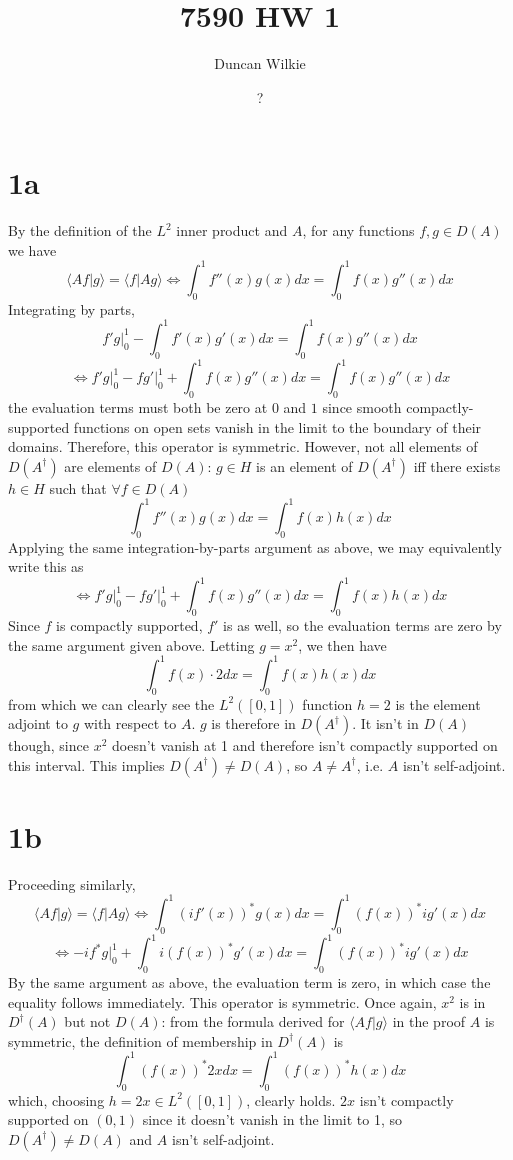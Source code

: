 \documentclass{article}
\title{7590 HW 1}
\author{Duncan Wilkie}
\date{?}
\begin{document}
\maketitle

\section*{1a}
By the definition of the $L^2$ inner product and $A$, for any functions $f,g\in D(A)$ we have
\[\langle Af|g \rangle=\langle f|Ag \rangle\Leftrightarrow \int_0^1f''(x)g(x)dx=\int_0^1f(x)g''(x)dx \]
Integrating by parts,
\[f'g\bigg|_0^1-\int_0^1f'(x)g'(x)dx=\int_0^1f(x)g''(x)dx\]
\[\Leftrightarrow f'g\bigg|_0^1-fg'\bigg|_0^1+\int_0^1f(x)g''(x)dx=\int_0^1f(x)g''(x)dx\]
the evaluation terms  must both be zero at $0$ and $1$ since smooth compactly-supported functions on open sets vanish
in the limit to the boundary of their domains. %
Therefore, this operator is symmetric.
However, not all elements of $D(A^{\dagger})$ are elements of $D(A)$: $g\in H$ is an element of $D(A^{\dagger})$ iff there exists
$h\in H$ such that $\forall f\in D(A)$
\[
  \int_{0}^{1}f''(x)g(x)dx=\int_{0}^{1}f(x)h(x)dx
\]
Applying the same integration-by-parts argument as above, we may equivalently write this as
\[\Leftrightarrow f'g\bigg|_0^1-fg'\bigg|_0^1+\int_0^1f(x)g''(x)dx=\int_0^1f(x)h(x)dx\]
Since $f$ is compactly supported, $f'$ is as well, so the evaluation terms are zero by the same argument given above.
Letting $g=x^{2}$, we then have
\[\int_{0}^{1}f(x)\cdot 2dx=\int_{0}^{1}f(x)h(x)dx\]
from which we can clearly see the $L^{2}([0,1])$ function $h=2$ is the element adjoint to $g$ with respect to $A$.
$g$ is therefore in $D(A^{\dagger})$.
It isn't in $D(A)$ though, since $x^{2}$ doesn't vanish at 1 and therefore isn't compactly supported on this interval.
This implies $D(A^{\dagger})\neq D(A)$, so $A\neq A^{\dagger}$, i.e. $A$ isn't self-adjoint.

\section*{1b}
Proceeding similarly,
\[
  \langle Af|g \rangle=\langle f|Ag \rangle
  \Leftrightarrow \int_{0}^{1}(if'(x))^{*}g(x)dx=\int_{0}^{1}(f(x))^{*}ig'(x)dx
\]
\[
  \Leftrightarrow -if^{*}g\bigg|_{0}^{1}+\int_{0}^{1}i(f(x))^{*}g'(x)dx=\int_{0}^{1}(f(x))^{*}ig'(x)dx
\]
By the same argument as above, the evaluation term is zero, in which case the equality follows immediately.
This operator is symmetric.
Once again, $x^{2}$ is in $D^{\dagger}(A)$ but not $D(A)$: from the formula derived for $\langle Af|g \rangle$ in the proof $A$ is symmetric,
the definition of membership in $D^{\dagger}(A)$ is
\[\int_{0}^{1}(f(x))^{*}2xdx=\int_{0}^{1}(f(x))^{*}h(x)dx\]
which, choosing $h=2x\in L^{2}([0,1])$, clearly holds.
$2x$ isn't compactly supported on $(0,1)$ since it doesn't vanish in the limit to 1, so $D(A^{\dagger})\neq D(A)$ and $A$ isn't self-adjoint.
\end{document}
